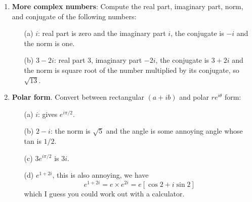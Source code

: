 \documentclass[11pt,a4paper]{scrartcl}
\begin{document}
\begin{enumerate}
	\item \textbf{More complex numbers}: Compute the real part, imaginary part, norm, and conjugate of the following numbers:
	\begin{itemize}
		\item[(a)] $i$: real part is zero and the imaginary part $i$, the conjugate is $-i$ and the norm is one.
		\item[(b)] $3-2i$: real part 3, imaginary part $-2i$, the conjugate is $3+2i$ and the norm is square root of the number multiplied by its conjugate, so $\sqrt{13}$.
	\end{itemize}
	
	
	\item  \textbf{Polar form}. Convert between rectangular $(a+ib)$ and polar $re^{i\theta}$ form:
	\begin{itemize}
		\item[(a)] $i$: gives $e^{i\pi/2}$.
		\item[(b)] $2-i$: the norm is $\sqrt{5}$ and the angle is some annoying angle whose tan is $1/2$. 
		\item[(c)] $3e^{i\pi/2}$ is $3i$.
		\item[(d)] $e^{1+2i}$, this is also annoying, we have
                  $$e^{1+2i}=e\times e^{2i}=e[\cos{2}+i\sin{2}]$$
                  which I guess you could work out with a calculator.
	\end{itemize}

        
	
        
\end{enumerate}
\end{document}
